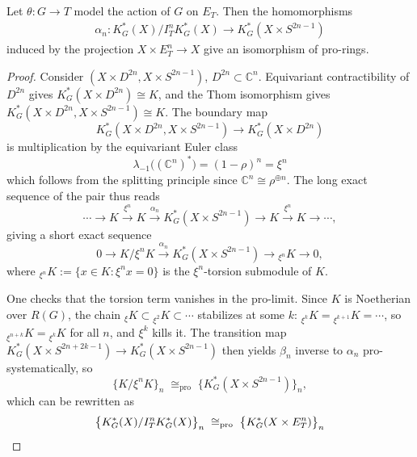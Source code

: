 \documentclass[12pt]{article}
\begin{document}
\begin{lemma}
    Let $\theta:G\to T$ model the action of $G$ on $E_T$. Then the homomorphisms \begin{align*}
        \alpha_n:K_G^*(X)/I_T^nK_G^*(X)\longrightarrow K_G^*(X\times S^{2n-1})
    \end{align*}
    induced by the projection $X\times E_T^n\to X$ give an isomorphism of pro-rings.
\end{lemma}

\begin{proof}
Consider $(X\times D^{2n}, X\times S^{2n-1})$, $D^{2n}\subset\mathbb C^n$.
Equivariant contractibility of $D^{2n}$ gives $K_G^*(X\times D^{2n})\cong K$, and the Thom isomorphism gives $K_G^*(X\times D^{2n}, X\times S^{2n-1})\cong K$. The boundary map
\[K_G^*(X\times D^{2n},X\times S^{2n-1})\to K_G^*(X\times D^{2n})\] is multiplication by the
equivariant Euler class
\[
\lambda_{-1}\big((\mathbb C^n)^*\big) = (1-\rho)^n = \xi^n
\] which follows from the splitting principle since $\mathbb C^n\cong\rho^{\oplus n}$. The long exact sequence of the pair thus reads
\[
\cdots \to K \xrightarrow{\xi^n} K \xrightarrow{\alpha_n} K_G^*(X\times S^{2n-1}) \to K \xrightarrow{\xi^n} K \to \cdots,
\]
giving a short exact sequence
\[
0\to K/\xi^nK \xrightarrow{\alpha_n} K_G^*(X\times S^{2n-1}) \to {}_{\xi^n}K \to 0,
\] where ${}_{\xi^n}K:=\{x\in K:\xi^nx=0\}$ is the $\xi^n$-torsion submodule of $K$. 

One checks that the torsion term vanishes in the pro-limit.
Since $K$ is Noetherian over $R(G)$, the chain
${}_{\xi}K\subset{}_{\xi^2}K\subset\cdots$ stabilizes at some $k$:
${}_{\xi^{k}}K={}_{\xi^{k+1}}K=\cdots$, so ${}_{\xi^{n+k}}K={}_{\xi^k}K$ for all $n$, and $\xi^k$
kills it. The transition map $K_G^*(X\times S^{2n+2k-1})\to K_G^*(X\times S^{2n-1})$ then yields
$\beta_n$ inverse to $\alpha_n$ pro-systematically, so
\[
\{K/\xi^nK\}_n \;\cong_{\mathrm{pro}}\; \{K_G^*(X\times S^{2n-1})\}_n,
\]
which can be rewritten as
\[
\big\{K_G^*(X)/I_T^nK_G^*(X)\big\}_n \;\cong_{\mathrm{pro}}\; \big\{K_G^*(X\times E_T^n)\big\}_n \qedhere
\]
\end{proof}
\end{document}
